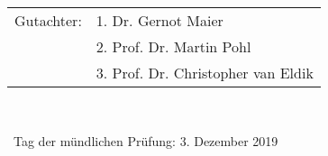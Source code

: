 \begin{titlepage}
\begin{spacing}{1}
\begin{center}
\cbreak


\begin{tabular}{ll}
Gutachter: 
& 1. Dr. Gernot Maier \\
& 2. Prof. Dr. Martin Pohl \\
& 3. Prof. Dr. Christopher van Eldik \\
\end{tabular}\\

\vspace{0.2\baselineskip}

~Tag der m\"undlichen Pr\"ufung: 3. Dezember 2019\\

\end{center}

\setlength{\parindent}{\parindentbak}
\setlength{\parskip}{\parskipbak}
\end{spacing}
\end{titlepage}
\makeatother
